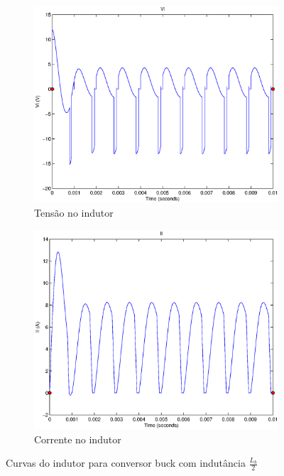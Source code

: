 \documentclass{article}
\begin{document}
\begin{figure}[H]
	\centering
	\begin{subfigure}[b]{0.4\linewidth}
		\includegraphics[width=\linewidth]{matlab/buck/b_vl2}
		\caption{Tensão no indutor}
	\end{subfigure}
	\begin{subfigure}[b]{0.4\linewidth}
		\centering
		\includegraphics[width=\linewidth]{matlab/buck/b_il2}
		\caption{Corrente no indutor}
	\end{subfigure}
	\caption{Curvas do indutor para conversor buck com indutância $\frac{L_b}{2}$}
	\label{fig:bl2}
\end{figure}
\end{document}
